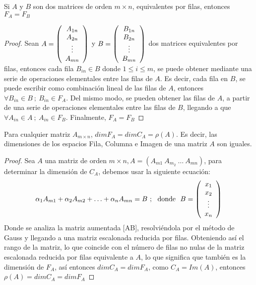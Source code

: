 \begin{theorem}
Si $A$ y $B$ son dos matrices de orden $m \times n$, equivalentes por filas, entonces $F_A = F_B$
\end{theorem}
\begin{proof}
    Sean $A = \left( \begin{array}{c} A_{1n}\\ A_{2n}\\ \vdots\\A_{mn} \end{array} \right) $ y $B = \left( \begin{array}{c} B_{1n}\\ B_{2n}\\ \vdots\\B_{mn} \end{array} \right) $ dos matrices equivalentes por filas, entonces cada fila $B_{in} \in B$ donde  $1 \leq i \leq m$, se puede obtener mediante una serie de operaciones elementales entre las filas de $A$. Es decir, cada fila en $B$, se puede escribir como combinación lineal de las filas de $A$, entonces $\forall B_{in} \in B \ ; \ B_{in} \in F_A$.
    Del mismo modo, se pueden obtener las filas de $A$, a partir de una serie de operaciones elementales entre las filas de $B$, llegando a que $\forall A_{in} \in A \ ; \ A_{in} \in F_B$. Finalmente, $F_A = F_B$
\end{proof}
\begin{theorem}
Para cualquier matriz  $A_{m\times n}$, $dimF_A = dimC_A = \rho(A)$. Es
decir, las dimensiones de los espacios Fila, Columna e Imagen de una matriz $A$
son iguales.
\end{theorem}
\begin{proof}
    Sea $A$ una matriz de orden $m \times n, A =\left( A_{m1} \  A_{m_2} \ \hdots \ A_{mn}\right)$, para determinar la dimensión de $C_A$, debemos usar la siguiente ecuación:
    $$\alpha_1 A_{m1} + \alpha_2 A_{m2} + \hdots + \alpha_n A_{mn} = B \ ; \ \text{ donde } \ B = \left( \begin{array}{c} x_1\\ x_2\\ \vdots\\x_n \end{array} \right) $$
    Donde se analiza la matriz aumentada [A\vline B], resolviéndola por el método de Gauss y llegando a una matriz escalonada reducida por filas. Obteniendo así el rango de la matriz, lo que coincide con el número de filas no nulas de la matriz escalonada reducida por filas equivalente a $A$, lo que significa que también es la dimensión de $F_A$, así entonces $dim C_A = dim F_A$, como $C_A = Im(A)$, entonces $\rho(A) = dim C_A = dim F_A$
\end{proof}
\newpage
